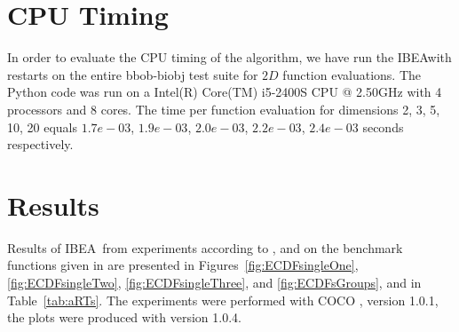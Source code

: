 \documentclass{sig-alternate}
\renewcommand{\algname}{IBEA}  %
\begin{document}
\section{CPU Timing}
In order to evaluate the CPU timing of the algorithm, we have run the \algname with restarts on the entire bbob-biobj test suite \cite{biobj2016func} for $2 D$ function evaluations. The Python code was run on a Intel(R) Core(TM) i5-2400S CPU @ 2.50GHz with 4 processors and 8 cores. The time per function evaluation for dimensions 2, 3, 5, 10, 20 equals $1.7e-03$, $1.9e-03$, $2.0e-03$, $2.2e-03$, $2.4e-03$ seconds respectively. 


\section{Results}

Results of \algname\ from experiments according to \cite{hansen2016exp}, \cite{hansen2016perfass} and \cite{biobj2016perfass} on the benchmark
functions given in \cite{biobj2016func} are presented in
Figures~\ref{fig:ECDFsingleOne}, \ref{fig:ECDFsingleTwo}, \ref{fig:ECDFsingleThree}, and \ref{fig:ECDFsGroups}, and in
Table~\ref{tab:aRTs}. The experiments were performed with COCO \cite{hansen2016cocoplat}, version 1.0.1, the plots were produced with version 1.0.4.
\end{document}
